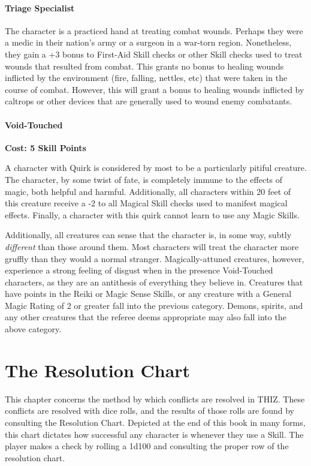 \documentclass[oneside]{book}
\begin{document}
\begin{multicols}{2}
\subsubsection{Triage Specialist}
The character is a practiced hand at treating combat wounds. Perhaps they were a medic in their nation's army or a surgeon in a war-torn region. Nonetheless, they gain a +3 bonus to First-Aid Skill checks or other Skill checks used to treat wounds that resulted from combat. This grants no bonus to healing wounds inflicted by the environment (fire, falling, nettles, etc) that were taken in the course of combat. However, this will grant a bonus to healing wounds inflicted by caltrops or other devices that are generally used to wound enemy combatants.

\subsubsection{Void-Touched}
\textbf{\small Cost: 5 Skill Points}

A character with Quirk is considered by most to be a particularly pitiful creature. The character, by some twist of fate, is completely immune to the effects of magic, both helpful and harmful. Additionally, all characters within 20 feet of this creature receive a -2 to all Magical Skill checks used to manifest magical effects. Finally, a character with this quirk cannot learn to use any Magic Skills.

Additionally, all creatures can sense that the character is, in some way, subtly \emph{different} than those around them. Most characters will treat the character more gruffly than they would a normal stranger. Magically-attuned creatures, however, experience a strong feeling of disgust when in the presence Void-Touched characters, as they are an antithesis of everything they believe in. Creatures that have points in the Reiki or Magic Sense Skills, or any creature with a General Magic Rating of 2 or greater fall into the previous category. Demons, spirits, and any other creatures that the referee deems appropriate may also fall into the above category.
\end{multicols}

\chapter{The Resolution Chart}
This chapter concerns the method by which conflicts are resolved in THIZ. These conflicts are resolved with dice rolls, and the results of those rolls are found by consulting the Resolution Chart. Depicted at the end of this book in many forms, this chart dictates how successful any character is whenever they use a Skill. The player makes a check by rolling a 1d100 and consulting the proper row of the resolution chart.
\end{document}
